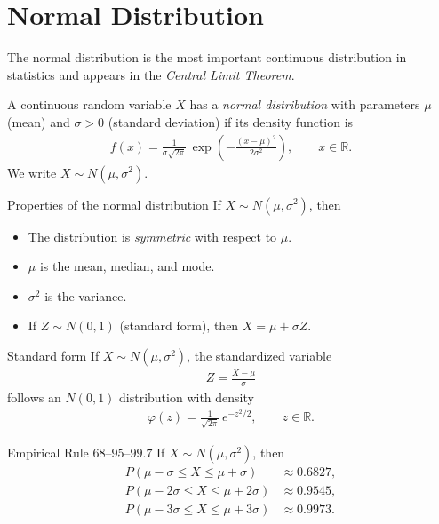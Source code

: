 \section{Normal Distribution}

The normal distribution is the most important continuous distribution in statistics and appears in the \emph{Central Limit Theorem}.

\begin{definicion}
A continuous random variable $X$ has a \emph{normal distribution} with parameters $\mu$ (mean) and $\sigma > 0$ (standard deviation) if its density function is
\begin{align}
 \label{eq:2.8.3}
 f(x) = \frac{1}{\sigma\sqrt{2\pi}}\,\exp\!\left(-\frac{(x-\mu)^2}{2\sigma^2}\right),
 \qquad x \in \mathbb{R}.
\end{align}
We write $X \sim N(\mu, \sigma^2)$.
\end{definicion}

{Properties of the normal distribution} If $X \sim N(\mu,\sigma^2)$, then
\begin{itemize}
 \item The distribution is \emph{symmetric} with respect to $\mu$.
 \item $\mu$ is the mean, median, and mode.
 \item $\sigma^2$ is the variance.
 \item If $Z \sim N(0,1)$ (standard form), then $X = \mu + \sigma Z$.
\end{itemize}

{Standard form} If $X \sim N(\mu, \sigma^2)$, the standardized variable
\begin{align}
 \label{eq:2.8.4}
 Z = \frac{X - \mu}{\sigma}
\end{align}
follows an $N(0,1)$ distribution with density
\begin{align}
 \label{eq:2.8.5}
 \varphi(z) = \frac{1}{\sqrt{2\pi}}\,e^{-z^2/2}, \qquad z \in \mathbb{R}.
\end{align}

{Empirical Rule $68$--$95$--$99.7$} If $X \sim N(\mu,\sigma^2)$, then
\begin{align}
 P(\mu - \sigma \leq X \leq \mu + \sigma) &\approx 0.6827, \\
 P(\mu - 2\sigma \leq X \leq \mu + 2\sigma) &\approx 0.9545, \\
 P(\mu - 3\sigma \leq X \leq \mu + 3\sigma) &\approx 0.9973.
\end{align}


